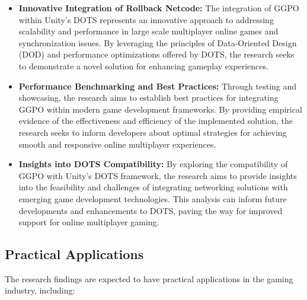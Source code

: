 \begin{itemize}
    \item \textbf{Innovative Integration of Rollback Netcode:} The integration of GGPO within Unity's DOTS represents an innovative approach to addressing scalability and performance in large scale multiplayer online games and synchronization issues. By leveraging the principles of Data-Oriented Design (DOD) and performance optimizations offered by DOTS, the research seeks to demonstrate a novel solution for enhancing gameplay experiences.
    
    \item \textbf{Performance Benchmarking and Best Practices:} Through testing and showcasing, the research aims to establish best practices for integrating GGPO within modern game development frameworks. By providing empirical evidence of the effectiveness and efficiency of the implemented solution, the research seeks to inform developers about optimal strategies for achieving smooth and responsive online multiplayer experiences.
    
    \item \textbf{Insights into DOTS Compatibility:} By exploring the compatibility of GGPO with Unity's DOTS framework, the research aims to provide insights into the feasibility and challenges of integrating networking solutions with emerging game development technologies. This analysis can inform future developments and enhancements to DOTS, paving the way for improved support for online multiplayer gaming.
\end{itemize}

\subsection{Practical Applications}

The research findings are expected to have practical applications in the gaming industry, including:

